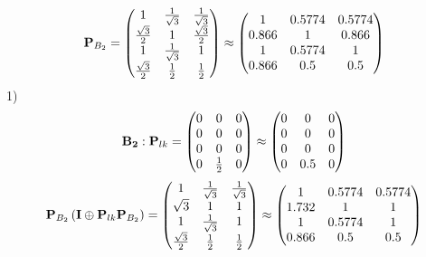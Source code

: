 \documentclass[10pt,a4paper]{article}
\begin{document}
	\[
		\bold{P}_{B_2} = 
		\begin{pmatrix}
			{1} {} & \frac{1} {\sqrt{3}} & \frac{1} {\sqrt{3}} \\
			\frac{\sqrt{3}} {{2}} & {1} {} & \frac{\sqrt{3}} {{2}} \\
			{1} {} & \frac{1} {\sqrt{3}} & {1} {} \\
			\frac{\sqrt{3}} {{2}} & \frac{1} {{2}} & \frac{1} {{2}} \\
		\end{pmatrix}
		\approx
		\begin{pmatrix}
			1        & 0.5774   & 0.5774   \\
			0.866    & 1        & 0.866    \\
			1        & 0.5774   & 1        \\
			0.866    & 0.5      & 0.5      \\
		\end{pmatrix}
	\]
	1)
	\[
		\bold{B_2}: \bold{P}_{lk} = 
		\begin{pmatrix}
			{{0}} {} & {{0}} {} & {{0}} {} \\
			{{0}} {} & {{0}} {} & {{0}} {} \\
			{{0}} {} & {{0}} {} & {{0}} {} \\
			{{0}} {} & \frac{1} {{2}} & {{0}} {} \\
		\end{pmatrix}
		\approx
		\begin{pmatrix}
			0        & 0        & 0        \\
			0        & 0        & 0        \\
			0        & 0        & 0        \\
			0        & 0.5      & 0        \\
		\end{pmatrix}
	\]
	\[
		\bold{P}_{B_2}\left(\bold{I} \oplus \bold{P}_{lk}\bold{P}_{B_2}\right) = 
		\begin{pmatrix}
			{1} {} & \frac{1} {\sqrt{3}} & \frac{1} {\sqrt{3}} \\
			{\sqrt{3}} {} & {1} {} & {1} {} \\
			{1} {} & \frac{1} {\sqrt{3}} & {1} {} \\
			\frac{\sqrt{3}} {{2}} & \frac{1} {{2}} & \frac{1} {{2}} \\
		\end{pmatrix}
		\approx
		\begin{pmatrix}
			1        & 0.5774   & 0.5774   \\
			1.732    & 1        & 1        \\
			1        & 0.5774   & 1        \\
			0.866    & 0.5      & 0.5      \\
		\end{pmatrix}
	\]
\end{document}

